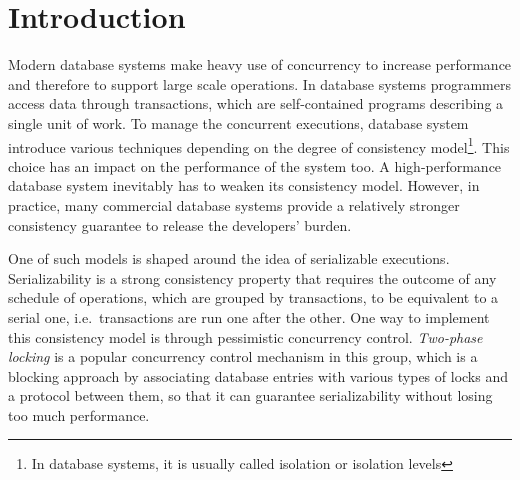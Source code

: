 \chapter{Introduction}

Modern database systems make heavy use of concurrency to increase performance and therefore to support large scale operations. In database systems programmers access data through transactions, which are self-contained programs describing a single unit of work. To manage the concurrent executions, database system introduce various techniques depending on the degree of consistency model\footnote{In database systems, it is usually called isolation or isolation levels}. This choice has an impact on the performance of the system too. A high-performance database system inevitably has to weaken its consistency model. However, in practice, many commercial database systems provide a relatively stronger consistency guarantee to release the developers' burden.


One of such models is shaped around the idea of serializable executions. Serializability is a strong consistency property that requires the outcome of any schedule of operations, which are grouped by transactions, to be equivalent to a serial one, i.e.\ transactions are run one after the other. One way to implement this consistency model is through pessimistic concurrency control. \textit{Two-phase locking} is a popular concurrency control mechanism in this group, which is a blocking approach by associating database entries with various types of locks and a protocol between them, so that it can guarantee serializability without losing too much performance.

